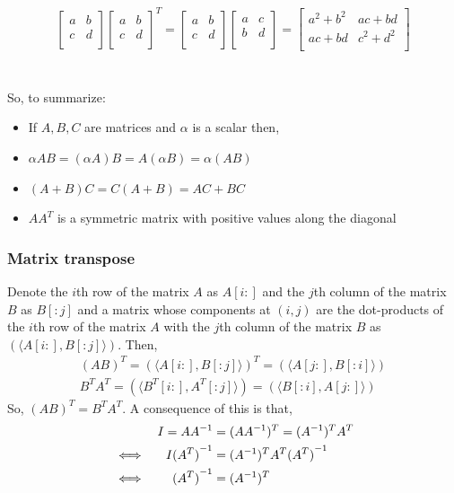 \documentclass[MathsNotesBase.tex]{subfiles}
\begin{document}
{		\begin{align*}
			\begin{bmatrix}
			a & b \\
			c & d \\
			\end{bmatrix}
			\begin{bmatrix}
			a & b \\
			c & d \\
			\end{bmatrix}^{T}
			=
			\begin{bmatrix}
			a & b \\
			c & d \\
			\end{bmatrix}
			\begin{bmatrix}
			a & c \\
			b & d \\
			\end{bmatrix}
			=
			\begin{bmatrix}
			a^{2} + b^{2} & ac + bd \\
			ac + bd & c^{2} + d^{2} \\
			\end{bmatrix}		
		\end{align*}
		\\\\
		So, to summarize:
		\begin{itemize}
		\item[]{If $A,B,C$ are matrices and $\alpha$ is a scalar then,}
		\item{$\alpha AB = (\alpha A)B = A(\alpha B) = \alpha(AB)$}
		\item{$(A + B)C = C(A + B) = AC + BC$}
		\item{$AA^{T}$ is a symmetric matrix with positive values along the diagonal}
		\end{itemize}
		
		\bigskip
		\subsubsection{Matrix transpose}
		Denote the $i$th row of the matrix $A$ as $A[i:]$ and the $j$th column of the matrix $B$ as $B[:j]$ and a matrix whose components at $(i,j)$ are the dot-products of the $i$th row of the matrix $A$ with the $j$th column of the matrix $B$ as $(\langle A[i:], B[:j] \rangle)$. Then,
		\begin{align*}
		(AB)^{T} = (\langle A[i:], B[:j] \rangle)^{T} = (\langle A[j:], B[:i] \rangle) \\
		B^{T}A^{T} = (\langle B^{T}[i:], A^{T}[:j] \rangle) = (\langle B[:i], A[j:] \rangle)
		\end{align*}
		So, $(AB)^{T} = B^{T}A^{T}$. A consequence of this is that,
		\begin{align*}
		&& I = A{A}^{-1} &= (AA^{-1})^{T} = (A^{-1})^{T}A^{T} \\
		& \iff & I{(A^{T})}^{-1} &= (A^{-1})^{T}A^{T}{(A^{T})}^{-1} \\
		& \iff & {(A^{T})}^{-1} &= (A^{-1})^{T}
		\end{align*}
		
}
\end{document}
